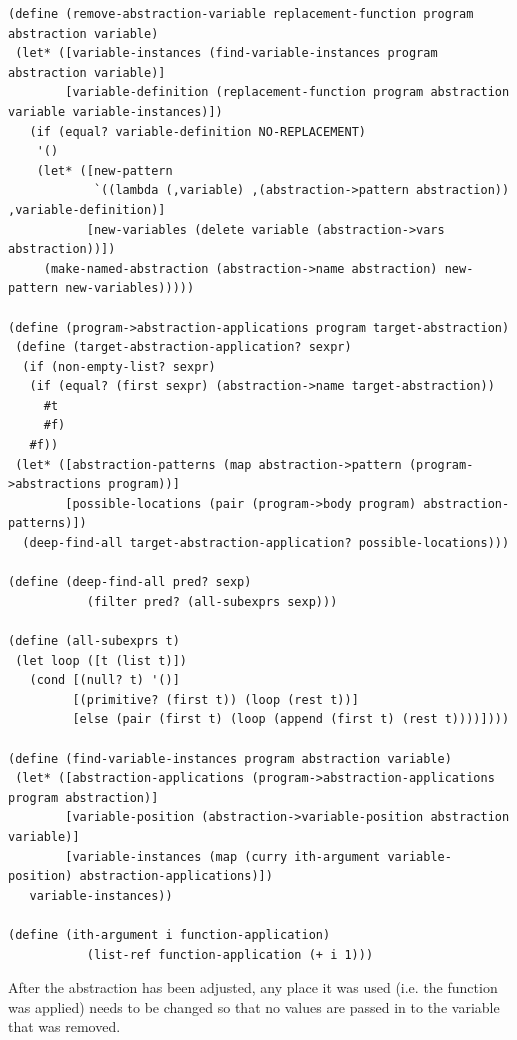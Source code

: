 \documentclass[a4paper,10pt]{article}
\begin{document}
\begin{verbatim}
(define (remove-abstraction-variable replacement-function program abstraction variable)
 (let* ([variable-instances (find-variable-instances program abstraction variable)]
        [variable-definition (replacement-function program abstraction variable variable-instances)])
   (if (equal? variable-definition NO-REPLACEMENT)
    '()
    (let* ([new-pattern 
            `((lambda (,variable) ,(abstraction->pattern abstraction)) ,variable-definition)]
           [new-variables (delete variable (abstraction->vars abstraction))])
     (make-named-abstraction (abstraction->name abstraction) new-pattern new-variables)))))

(define (program->abstraction-applications program target-abstraction)
 (define (target-abstraction-application? sexpr)
  (if (non-empty-list? sexpr)
   (if (equal? (first sexpr) (abstraction->name target-abstraction))
     #t
     #f)
   #f))
 (let* ([abstraction-patterns (map abstraction->pattern (program->abstractions program))]
        [possible-locations (pair (program->body program) abstraction-patterns)])
  (deep-find-all target-abstraction-application? possible-locations)))

(define (deep-find-all pred? sexp)
           (filter pred? (all-subexprs sexp)))

(define (all-subexprs t)
 (let loop ([t (list t)])
   (cond [(null? t) '()]
         [(primitive? (first t)) (loop (rest t))]
         [else (pair (first t) (loop (append (first t) (rest t))))])))

(define (find-variable-instances program abstraction variable)
 (let* ([abstraction-applications (program->abstraction-applications program abstraction)]
        [variable-position (abstraction->variable-position abstraction variable)]
        [variable-instances (map (curry ith-argument variable-position) abstraction-applications)])
   variable-instances))

(define (ith-argument i function-application)
           (list-ref function-application (+ i 1)))
\end{verbatim}
After the abstraction has been adjusted, any place it was used (i.e. the function was applied) needs to be changed so that no values are passed in to the variable that was removed.
\end{document}

